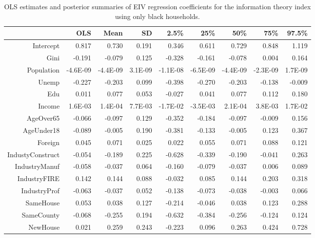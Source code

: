 \documentclass[12pt]{article}
\begin{document}
\begin{table}[ht]
\centering
\begin{tabular}{rrrrrrrrr}
  \hline
 & OLS & Mean & SD & 2.5\% & 25\% & 50\% & 75\% & 97.5\% \\ 
  \hline
Intercept & 0.817 & 0.730 & 0.191 & 0.346 & 0.611 & 0.729 & 0.848 & 1.119 \\ 
  Gini & -0.191 & -0.079 & 0.125 & -0.328 & -0.161 & -0.078 & 0.004 & 0.164 \\ 
  Population & -4.6E-09 & -4.4E-09 & 3.1E-09 & -1.1E-08 & -6.5E-09 & -4.4E-09 & -2.3E-09 & 1.7E-09 \\ 
  Unemp & -0.227 & -0.203 & 0.099 & -0.398 & -0.270 & -0.203 & -0.138 & -0.009 \\ 
  Edu & 0.011 & 0.077 & 0.053 & -0.027 & 0.041 & 0.077 & 0.112 & 0.180 \\ 
  Income & 1.6E-03 & 1.4E-04 & 7.7E-03 & -1.7E-02 & -3.5E-03 & 2.1E-04 & 3.8E-03 & 1.7E-02 \\ 
  AgeOver65 & -0.066 & -0.097 & 0.129 & -0.352 & -0.184 & -0.097 & -0.009 & 0.156 \\ 
  AgeUnder18 & -0.089 & -0.005 & 0.190 & -0.381 & -0.133 & -0.005 & 0.123 & 0.367 \\ 
  Foreign & 0.045 & 0.071 & 0.025 & 0.022 & 0.055 & 0.071 & 0.088 & 0.121 \\ 
  IndustyConstruct & -0.054 & -0.189 & 0.225 & -0.628 & -0.339 & -0.190 & -0.041 & 0.263 \\ 
  IndustryManuf & -0.058 & -0.037 & 0.064 & -0.160 & -0.079 & -0.037 & 0.006 & 0.089 \\ 
  IndustryFIRE & 0.142 & 0.144 & 0.088 & -0.032 & 0.085 & 0.144 & 0.203 & 0.318 \\ 
  IndustryProf & -0.063 & -0.037 & 0.052 & -0.138 & -0.073 & -0.038 & -0.003 & 0.066 \\ 
  SameHouse & 0.053 & 0.038 & 0.127 & -0.214 & -0.046 & 0.038 & 0.123 & 0.288 \\ 
  SameCounty & -0.068 & -0.255 & 0.194 & -0.632 & -0.384 & -0.256 & -0.124 & 0.124 \\ 
  NewHouse & 0.021 & 0.259 & 0.243 & -0.223 & 0.096 & 0.263 & 0.424 & 0.728 \\ 
   \hline
\end{tabular}
\caption{OLS estimates and posterior summaries of EIV regression coefficients for the information theory index using only black households.}
\label{tab:eiv.hr.raw.black}
\end{table}
\end{document}
